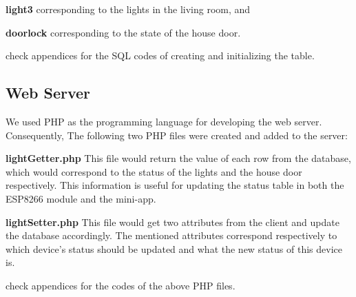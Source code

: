 \documentclass[12pt,a4paper]{report}
\begin{document}
\noindent\textbf{light3} corresponding to the lights in the living room, and 

\vspace{0.15cm}
\noindent\textbf{doorlock} corresponding to the state of the house door.

\vspace{0.3cm}

\noindent check appendices for the SQL codes of creating and initializing the table.

\subsection{Web Server}
We used PHP as the programming language for developing the web server. Consequently, The following two PHP files were created and added to the server:
\vspace{0.15cm}

\noindent \textbf{lightGetter.php} This file would return the value of each row from the database, which would correspond to the status of the lights and the house door respectively. This information is useful for updating the status table in both the ESP8266 module and the mini-app.
\vspace{0.15cm}

\noindent \textbf{lightSetter.php} This file would get two attributes from the client and update the database accordingly. The mentioned attributes correspond respectively to which device's status should be updated and what the new status of this device is. 
\vspace{0.3cm}

\noindent check appendices for the codes of the above PHP files.
\end{document}
